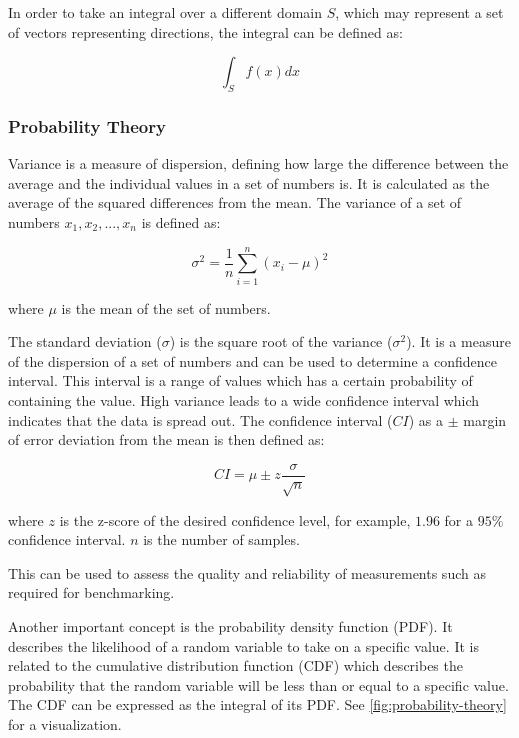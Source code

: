 In order to take an integral over a different domain $S$, which may represent a set of vectors representing directions, the integral can be defined as:

\begin{equation}
  \label{eqn:integral-domain}
  \int_{S} f(x) dx
\end{equation}

\subsubsection{Probability Theory}
\label{sec:probabilityTheory}

Variance is a measure of dispersion, defining how large the difference between the average and the individual values in a set of numbers is. It is calculated as the average of the squared differences from the mean. The variance of a set of numbers $x_1, x_2, ..., x_n$ is defined as:

\begin{equation}
  \label{eqn:variance}
  \sigma^2 = \frac{1}{n} \sum_{i=1}^{n} (x_i - \mu)^2
\end{equation}

where $\mu$ is the mean of the set of numbers.

The standard deviation ($\sigma$) is the square root of the variance ($\sigma^2$). It is a measure of the dispersion of a set of numbers and can be used to determine a confidence interval. This interval is a range of values which has a certain probability of containing the value. High variance leads to a wide confidence interval which indicates that the data is spread out. The confidence interval ($CI$) as a $\pm$ margin of error deviation from the mean is then defined as:

\begin{equation}
  \label{eqn:confidence-interval}
  CI = \mu \pm z \frac{\sigma}{\sqrt{n}}
\end{equation}

where $z$ is the z-score of the desired confidence level, for example, $1.96$ for a $95\%$ confidence interval. $n$ is the number of samples.

This can be used to assess the quality and reliability of measurements such as required for benchmarking.

Another important concept is the probability density function (\gls{PDF}). It describes the likelihood of a random variable to take on a specific value. It is related to the cumulative distribution function (\gls{CDF}) which describes the probability that the random variable will be less than or equal to a specific value. The \gls{CDF} can be expressed as the integral of its \gls{PDF}. See \autoref{fig:probability-theory} for a visualization.

